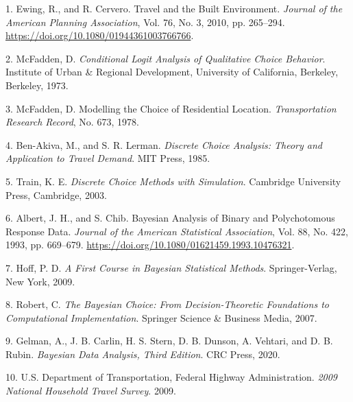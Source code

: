 \documentclass[numbered]{trbunofficial}
\begin{document}
\hypertarget{refs}{}
\begin{cslreferences}
\leavevmode\hypertarget{ref-ewing_travel_2010-1}{}%
1. Ewing, R., and R. Cervero. Travel and the Built Environment. \emph{Journal of the American Planning Association}, Vol. 76, No. 3, 2010, pp. 265--294. \url{https://doi.org/10.1080/01944361003766766}.

\leavevmode\hypertarget{ref-mcfaddenConditionalLogitAnalysis1973}{}%
2. McFadden, D. \emph{Conditional Logit Analysis of Qualitative Choice Behavior}. Institute of Urban \& Regional Development, University of California, Berkeley, Berkeley, 1973.

\leavevmode\hypertarget{ref-mcfaddenModellingChoiceResidential1978}{}%
3. McFadden, D. Modelling the Choice of Residential Location. \emph{Transportation Research Record}, No. 673, 1978.

\leavevmode\hypertarget{ref-ben-akivaDiscreteChoiceAnalysis1985}{}%
4. Ben-Akiva, M., and S. R. Lerman. \emph{Discrete Choice Analysis: Theory and Application to Travel Demand}. MIT Press, 1985.

\leavevmode\hypertarget{ref-trainDiscreteChoiceMethods2003}{}%
5. Train, K. E. \emph{Discrete Choice Methods with Simulation}. Cambridge University Press, Cambridge, 2003.

\leavevmode\hypertarget{ref-albertBayesianAnalysisBinary1993a}{}%
6. Albert, J. H., and S. Chib. Bayesian Analysis of Binary and Polychotomous Response Data. \emph{Journal of the American Statistical Association}, Vol. 88, No. 422, 1993, pp. 669--679. \url{https://doi.org/10.1080/01621459.1993.10476321}.

\leavevmode\hypertarget{ref-hoffFirstCourseBayesian2009}{}%
7. Hoff, P. D. \emph{A First Course in Bayesian Statistical Methods}. Springer-Verlag, New York, 2009.

\leavevmode\hypertarget{ref-robertBayesianChoiceDecisionTheoretic2007}{}%
8. Robert, C. \emph{The Bayesian Choice: From Decision-Theoretic Foundations to Computational Implementation}. Springer Science \& Business Media, 2007.

\leavevmode\hypertarget{ref-gelmanBayesianDataAnalysis2020}{}%
9. Gelman, A., J. B. Carlin, H. S. Stern, D. B. Dunson, A. Vehtari, and D. B. Rubin. \emph{Bayesian Data Analysis, Third Edition}. CRC Press, 2020.

\leavevmode\hypertarget{ref-nhts_2009}{}%
10. U.S. Department of Transportation, Federal Highway Administration. \emph{2009 National Household Travel Survey}. 2009.
\end{cslreferences}
\end{document}
